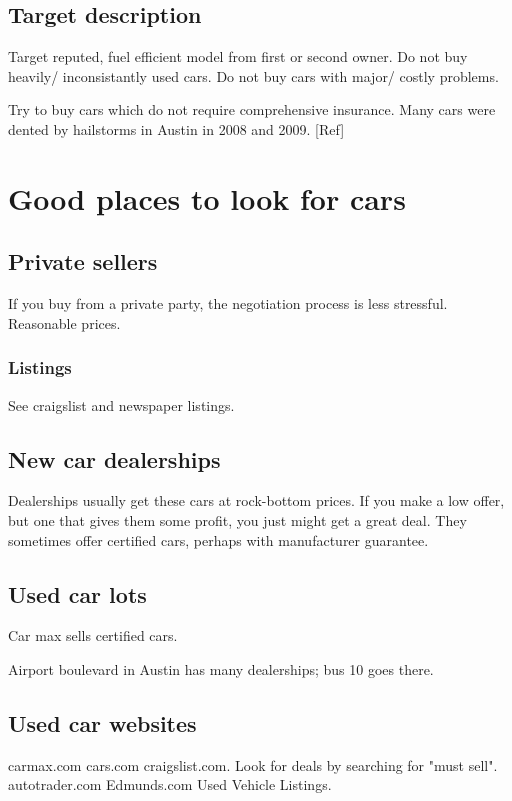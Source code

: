 \documentclass[oneside, article]{memoir}
\begin{document}
\subsection{Target description}

Target reputed, fuel efficient model from first or second owner. Do not buy heavily/ inconsistantly used cars. Do not buy cars with major/ costly problems.

Try to buy cars which do not require comprehensive insurance. Many cars were dented by hailstorms in Austin in 2008 and 2009. [Ref]

\section{Good places to look for cars}
\subsection{Private sellers}
\subitem If you buy from a private party, the negotiation process is less stressful.
\subitem Reasonable prices.

\subsubsection{Listings}
See craigslist and newspaper listings.

\subsection{New car dealerships}
\subitem Dealerships usually get these cars at rock-bottom prices. If you make a low offer, but one that gives them some profit, you just might get a great deal.
\subitem They sometimes offer certified cars, perhaps with manufacturer guarantee.

\subsection{Used car lots}
Car max sells certified cars.

\subitem Airport boulevard in Austin has many dealerships; bus 10 goes there.

\subsection{Used car websites}
\subitem carmax.com
\subitem cars.com
\subitem craigslist.com. Look for deals by searching for "must sell".
\subitem autotrader.com
\subitem Edmunds.com Used Vehicle Listings.
\end{document}
